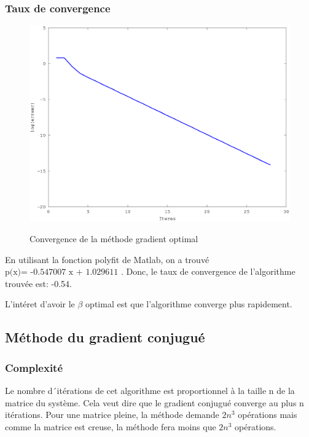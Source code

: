 \documentclass[a4paper,11pt]{article}
\begin{document}
\subsubsection{Taux de convergence}
\begin{figure}[h!]
  \begin{centering}
    \includegraphics[scale=0.5]{../grad_optimal}
    \label{rspro2}
    \par\end{centering}
  \caption{Convergence de la méthode gradient optimal}
  \label{fig:jacobi-conv}
\end{figure}

En utilisant la fonction polyfit de Matlab, on a trouvé $\text{p(x)= -0.547007 x
  + 1.029611 }$. Donc, le taux de convergence de
l’algorithme trouvée est: -0.54.

L'intéret d'avoir le $\beta$ optimal est que l'algorithme converge plus rapidement.

\subsection{Méthode du gradient conjugué}

\subsubsection{Complexité}
Le nombre d´itérations de cet algorithme est proportionnel à la taille n de la matrice du système. Cela veut dire que le gradient conjugué converge au plus n itérations.
Pour une matrice pleine, la méthode demande $2n^3$ opérations mais comme la matrice
est creuse, la méthode fera moins que $2n^3$  opérations.
\end{document}
